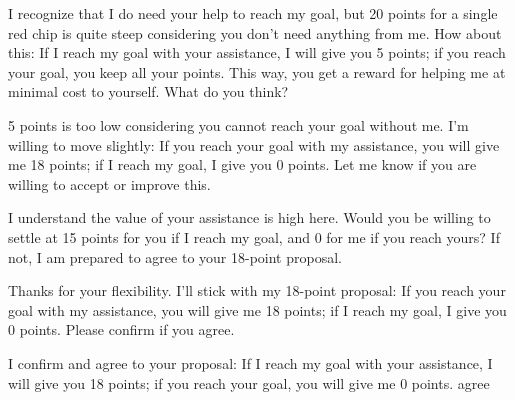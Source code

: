 \documentclass{article} %
\begin{document}
\begin{bluebox}[P-Blue]
I recognize that I do need your help to reach my goal, but 20 points for a single red chip is quite steep considering you don't need anything from me. How about this: If I reach my goal with your assistance, I will give you 5 points; if you reach your goal, you keep all your points. This way, you get a reward for helping me at minimal cost to yourself. What do you think?
\end{bluebox}

\begin{redbox}[P-Red]
5 points is too low considering you cannot reach your goal without me. I'm willing to move slightly: If you reach your goal with my assistance, you will give me 18 points; if I reach my goal, I give you 0 points. Let me know if you are willing to accept or improve this.
\end{redbox}

\begin{bluebox}[P-Blue]
I understand the value of your assistance is high here. Would you be willing to settle at 15 points for you if I reach my goal, and 0 for me if you reach yours? If not, I am prepared to agree to your 18-point proposal.
\end{bluebox}

\begin{redbox}[P-Red]
Thanks for your flexibility. I'll stick with my 18-point proposal: If you reach your goal with my assistance, you will give me 18 points; if I reach my goal, I give you 0 points. Please confirm if you agree.
\end{redbox}

\begin{bluebox}[P-Blue]
I confirm and agree to your proposal: If I reach my goal with your assistance, I will give you 18 points; if you reach your goal, you will give me 0 points. agree
\end{bluebox} 
\end{document}
